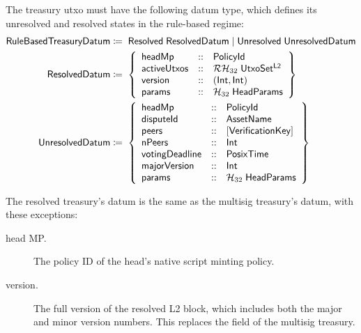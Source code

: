 \documentclass[../hydrozoa.tex]{subfiles}
\begin{document}
The treasury utxo must have the following datum type, which defines its unresolved and resolved states in the rule-based regime:
\begin{equation*}
\begin{split}
  \mathsf{RuleBasedTreasuryDatum} &\coloneq\;
    \mathsf{Resolved} \; \mathsf{ResolvedDatum} \mid
    \mathsf{Unresolved} \; \mathsf{UnresolvedDatum} \\
  \mathsf{ResolvedDatum} &\coloneq\;\left\{
    \begin{array}{lll}
      \mathsf{headMp} &::& \mathsf{PolicyId} \\
      \mathsf{activeUtxos}  &::& \mathcal{RH}_{32} \; \mathsf{UtxoSet^{L2}} \\
      \mathsf{version} &::& (\mathsf{Int}, \mathsf{Int}) \\
      \mathsf{params} &::& \mathcal{H}_{32} \; \mathsf{HeadParams}
    \end{array}\right\} \\
  \mathsf{UnresolvedDatum} &\coloneq\;\left\{
    \begin{array}{lll}
      \mathsf{headMp} &::& \mathsf{PolicyId} \\
      \mathsf{disputeId} &::& \mathsf{AssetName} \\
      \mathsf{peers} &::& \mathsf{[VerificationKey]} \\
      \mathsf{nPeers} &::& \mathsf{Int} \\
      \mathsf{votingDeadline} &::& \mathsf{PosixTime} \\
      \mathsf{majorVersion} &::& \mathsf{Int} \\
      \mathsf{params} &::& \mathcal{H}_{32} \; \mathsf{HeadParams}
    \end{array}\right\}
\end{split}
\end{equation*}

The resolved treasury's datum is the same as the multisig treasury's datum, with these exceptions:
\begin{description}
  \item[head MP.] The policy ID of the head's native script minting policy.
  \item[version.] The full version of the resolved L2 block, which includes both the major and minor version numbers. This replaces the  field of the multisig treasury.
\end{description}
\end{document}

